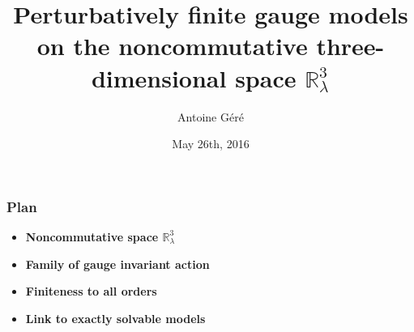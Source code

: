 \documentclass[9pt]{beamer}
\title{Perturbatively finite gauge models on the noncommutative three-dimensional space \texorpdfstring{$\mathbb{R}^3_\lambda$}{R3l}}
\author{Antoine Géré}
\institute{Università degli studi di Genova, Dipartimento di Matematica}
\date{May 26th, 2016}
\begin{document}



\begin{frame}[plain]
\titlepage
\end{frame}


\begin{frame}

\frametitle{Plan}

{\Large{
\begin{itemize}

\item \textbf{Noncommutative space $\mathbb{R}^3_\lambda$} \\[30pt]

\item \textbf{Family of gauge invariant action} \\[30pt]

\item \textbf{Finiteness to all orders} \\[30pt]

\item \textbf{Link to exactly solvable models}

\end{itemize}
}}

\end{frame}

\end{document}
